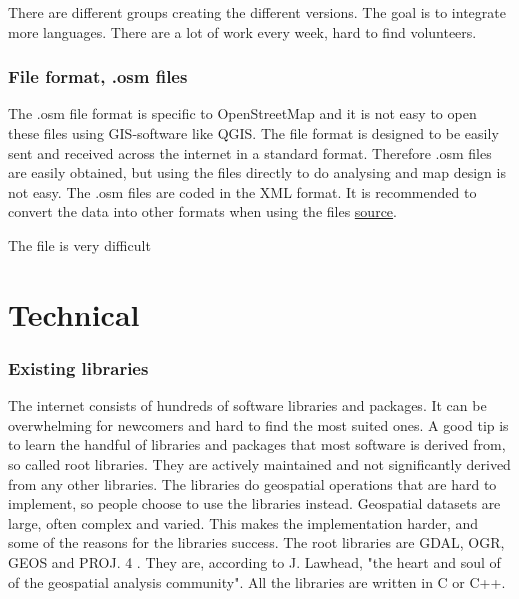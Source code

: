 There are different groups creating the different versions. The goal is to integrate more languages. There are a lot of work every week, hard to find volunteers. 

 \subsection{File format, .osm files}
The .osm file format is specific to OpenStreetMap and it is not easy to open these files using GIS-software like QGIS. The file format is designed to be easily sent and received across the internet in a standard format. Therefore .osm files are easily obtained, but using the files directly to do analysing and map design is not easy. The .osm files are coded in the XML format. It is recommended to convert the data into other formats when using the files \href{http://learnosm.org/en/osm-data/file-formats/}{source}. 

The file is very difficult


\chapter{Technical}
\subsection{Existing libraries}
The internet consists of hundreds of software libraries and packages. It can be overwhelming for newcomers and hard to find the most suited ones. A good tip is to learn the handful of libraries and packages that most software is derived from, so called root libraries. They are actively maintained and not significantly derived from any other libraries. The libraries do geospatial operations that are hard to implement, so people choose to use the libraries instead. Geospatial datasets are large, often complex and varied. This makes the implementation harder, and some of the reasons for the libraries success. The root libraries are GDAL, OGR, GEOS and PROJ. 4 \cite{Lawhead2013}.  They are, according to J. Lawhead, "the heart and soul of of the geospatial analysis community". All the libraries are written in C or C++. 






 